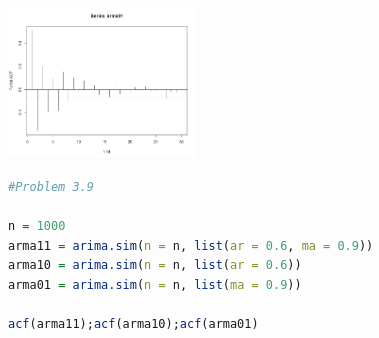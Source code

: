 \documentclass{article}
\begin{document}
\begin{CJK*}{GBK}{song}
\begin{enumerate}
\begin{center}
\includegraphics[width=5cm]{61.png}
\end{center}
\begin{lstlisting}[language=R,keywordstyle=\color{blue!70},commentstyle=\color{red!50!green!50!blue!50},frame=single,rulesepcolor=\color{red!20!green!20!blue!20},backgroundcolor=\color{backcolour},
]
#Problem 3.9

n = 1000
arma11 = arima.sim(n = n, list(ar = 0.6, ma = 0.9))
arma10 = arima.sim(n = n, list(ar = 0.6))
arma01 = arima.sim(n = n, list(ma = 0.9))

acf(arma11);acf(arma10);acf(arma01)


\end{lstlisting}
\end{enumerate}
\end{CJK*}
\end{document}
